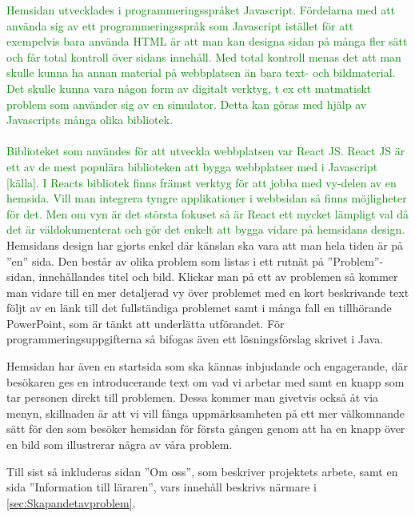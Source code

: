 \textcolor{green}{Hemsidan utvecklades i programmeringsspråket Javascript. Fördelarna med att använda sig av ett programmeringsspråk som Javascript istället för att exempelvis bara använda HTML är att man kan designa sidan på många fler sätt och får total kontroll över sidans innehåll. Med total kontroll menas det att man skulle kunna ha annan material på webbplatsen än bara text- och bildmaterial. Det skulle kunna vara någon form av digitalt verktyg, t ex ett matmatiskt problem som använder sig av en simulator. Detta kan göras med hjälp av Javascripts många olika bibliotek.}
\\ \\
\textcolor{green}{Biblioteket som användes för att utveckla webbplatsen var React JS. React JS är ett av de mest populära biblioteken att bygga webbplatser med i Javascript [källa]. I Reacts bibliotek finns främst verktyg för att jobba med vy-delen av en hemsida. Vill man integrera tyngre applikationer i webbsidan så finns möjligheter för det. Men om vyn är det största fokuset så är React ett mycket lämpligt val då det är väldokumenterat och gör det enkelt att bygga vidare på hemsidans design.}
\\

\textcolor{Mahogany}{Hemsidans design har gjorts enkel där känslan ska vara att man hela tiden är på ''en'' sida. Den består av olika problem som listas i ett rutnät på ''Problem''-sidan, innehållandes titel och bild. Klickar man på ett av problemen så kommer man vidare till en mer detaljerad vy över problemet med en kort beskrivande text följt av en länk till det fullständiga problemet samt i många fall en tillhörande PowerPoint, som är tänkt att underlätta utförandet. För programmeringsuppgifterna så bifogas även ett lösningsförslag skrivet i Java.}

\textcolor{Mahogany}{Hemsidan har även en startsida som ska kännas inbjudande och engagerande, där besökaren ges en introducerande text om vad vi arbetar med samt en knapp som tar personen direkt till problemen. Dessa kommer man givetvis också åt via menyn, skillnaden är att vi vill fånga uppmärksamheten på ett mer välkomnande sätt för den som besöker hemsidan för första gången genom att ha en knapp över en bild som illustrerar några av våra problem.}

\textcolor{Mahogany}{Till sist så inkluderas sidan ''Om oss'', som beskriver projektets arbete, samt en sida ''Information till läraren'', vars innehåll beskrivs närmare i \ref{sec:Skapandetavproblem}.}
